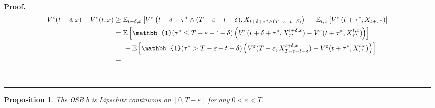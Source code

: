 \documentclass{tufte-handout}
\newcommand{\E}{\mathbb{E}} %
\newtheorem{pr}{Proposition}
\newenvironment{pf}[1][Proof]{\textbf{#1.} }{\ \rule{0.5em}{0.5em}}
\begin{document}
\begin{pf}
\begin{align*}
			V^\varepsilon(t + \delta, x) - V^\varepsilon(t, x) &\geq \E_{t + \delta, x}\left[V^\varepsilon\left(t + \delta + \tau^*\wedge(T - \varepsilon - t - \delta), X_{t + \delta + \tau^*\wedge(T - \varepsilon - t - \delta)}\right)\right] - \E_{t, x}\left[V^\varepsilon\left(t + \tau^*, X_{t + \tau^*}\right)\right] \nonumber \\
			&= \E\left[\mathbb{1}(\tau^* \leq T - \varepsilon - t - \delta)\left(V^\varepsilon(t + \delta + \tau^*, X_{\tau^*}^{t + \delta, x}) - V^\varepsilon(t + \tau^*, X_{\tau^*}^{t, x})\right)\right] \nonumber \\
			&\hspace{0.5cm} + \E\left[\mathbb{1}(\tau^* > T - \varepsilon - t - \delta)\left(V^\varepsilon(T - \varepsilon, X_{T - \varepsilon - t - \delta}^{t + \delta, x}) - V^\varepsilon(t + \tau^*, X_{\tau^*}^{t, x})\right)\right] \nonumber \\
			&=
		\end{align*}
	\end{pf}

	
	\begin{pr}\label{pr:OSB_LC_OUB}
		The OSB $b$ is Lipschitz continuous on $[0, T - \varepsilon]$ for any $0 < \varepsilon < T$.
	\end{pr}
	
\end{document}
